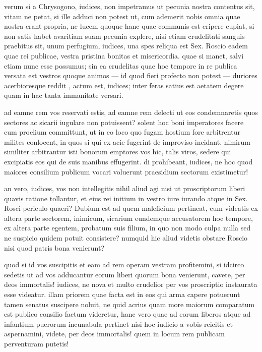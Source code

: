  verum si a Chrysogono, iudices, non impetramus ut pecunia nostra contentus sit, vitam ne petat, si ille adduci non potest ut, cum ademerit nobis omnia quae nostra erant propria, ne lucem quoque hanc quae communis est eripere cupiat, si non satis habet avaritiam suam pecunia explere, nisi etiam crudelitati sanguis praebitus sit, unum perfugium, iudices, una spes reliqua est Sex. Roscio eadem quae rei publicae, vestra pristina bonitas et misericordia. quae si manet, salvi etiam nunc esse possumus; sin ea crudelitas quae hoc tempore in re publica versata est vestros quoque animos — id quod fieri profecto non potest — duriores acerbioresque reddit , actum est, iudices; inter feras satius est aetatem degere quam in hac tanta immanitate versari.

 ad eamne rem vos reservati estis, ad eamne rem delecti ut eos condemnaretis quos sectores ac sicarii iugulare non potuissent? solent hoc boni imperatores facere cum proelium committunt, ut in eo loco quo fugam hostium fore arbitrentur milites conlocent, in quos si qui ex acie fugerint de improviso incidant. nimirum similiter arbitrantur isti bonorum emptores vos hic, talis viros, sedere qui excipiatis eos qui de suis manibus effugerint. di prohibeant, iudices, ne hoc quod maiores consilium publicum vocari voluerunt praesidium sectorum existimetur!

 an vero, iudices, vos non intellegitis nihil aliud agi nisi ut proscriptorum liberi quavis ratione tollantur, et eius rei initium in vestro iure iurando atque in Sex. Rosci periculo quaeri? Dubium est ad quem maleficium pertineat, cum videatis ex altera parte sectorem, inimicum, sicarium eundemque accusatorem hoc tempore, ex altera parte egentem, probatum suis filium, in quo non modo culpa nulla sed ne suspicio quidem potuit consistere? numquid hic aliud videtis obstare Roscio nisi quod patris bona venierunt?

 quod si id vos suscipitis et eam ad rem operam vestram profitemini, si idcirco sedetis ut ad vos adducantur eorum liberi quorum bona venierunt, cavete, per deos immortalis! iudices, ne nova et multo crudelior per vos proscriptio instaurata esse videatur. illam priorem quae facta est in eos qui arma capere potuerunt tamen senatus suscipere noluit, ne quid acrius quam more maiorum comparatum est publico consilio factum videretur, hanc vero quae ad eorum liberos atque ad infantium puerorum incunabula pertinet nisi hoc iudicio a vobis reicitis et aspernamini, videte, per deos immortalis! quem in locum rem publicam perventuram putetis!

